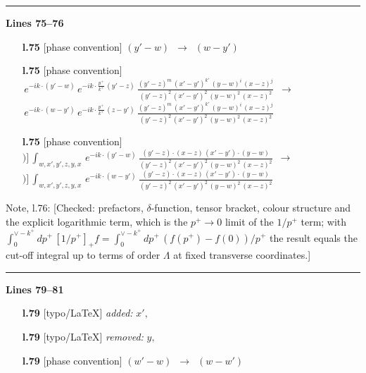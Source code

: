 \documentclass[10pt]{article}
\newenvironment{notebox}{\def\FrameCommand{{\color{notebar}\vrule width 1.5pt}\hspace{6pt}}\MakeFramed{\advance\hsize-\width\FrameRestore}\small}{\endMakeFramed}
\begin{document}
\noindent\rule{\linewidth}{0.3pt}\par\noindent\textbf{Lines 75--76} \par
\begin{itemize}[leftmargin=2.2em,itemsep=1pt,topsep=2pt]
\item[\textbf{l.75}] \textsf{\small [phase convention]} $\displaystyle (y'-w)$\ $\longrightarrow$\ $\displaystyle (w-y')$
\item[\textbf{l.75}] \textsf{\small [phase convention]} $\displaystyle \, e^{-ik\cdot (y'-w)}\, e^{-ik\cdot \frac{p^{+}}{k^{+}}\,(y'-z)}\,\frac{(y'-z)^{m}\,(x'-y')^{k'}\,(y-w)^{i}\,(x-z)^{j}}{(y'-z)^{2}\,(x'-y')^{2}\,(y-w)^{2}\,(x-z)^{2}}$\ $\longrightarrow$\ $\displaystyle \, e^{-ik\cdot (w-y')}\, e^{-ik\cdot \frac{p^{+}}{k^{+}}\,(z-y')}\,\frac{(y'-z)^{m}\,(x'-y')^{k'}\,(y-w)^{i}\,(x-z)^{j}}{(y'-z)^{2}\,(x'-y')^{2}\,(y-w)^{2}\,(x-z)^{2}}$
\item[\textbf{l.75}] \textsf{\small [phase convention]} $\displaystyle )\Big]\, \int_{w,x',y',z,y,x}\, e^{-ik\cdot (y'-w)}\,\frac{(y'-z)\cdot (x-z)\,(x'-y')\cdot (y-w)}{(y'-z)^{2}\,(x'-y')^{2}\,(y-w)^{2}\,(x-z)^{2}}$\ $\longrightarrow$\ $\displaystyle )\Big]\, \int_{w,x',y',z,y,x}\, e^{-ik\cdot (w-y')}\,\frac{(y'-z)\cdot (x-z)\,(x'-y')\cdot (y-w)}{(y'-z)^{2}\,(x'-y')^{2}\,(y-w)^{2}\,(x-z)^{2}}$
\end{itemize}
\begin{notebox}\textsf{\small Note, l.76:} [Checked: prefactors, $\delta$-function, tensor bracket, colour structure and the explicit logarithmic term, which is the $p^{+}\to 0$ limit of the $1/p^{+}$ term; with $\int_{0}^{\vee-k^{+}}dp^{+}\,[1/p^{+}]_{+}f=\int_{0}^{\vee-k^{+}}dp^{+}\,(f(p^{+})-f(0))/p^{+}$ the result equals the cut-off integral up to terms of order $\Lambda$ at fixed transverse coordinates.]\end{notebox}
\noindent\rule{\linewidth}{0.3pt}\par\noindent\textbf{Lines 79--81} \par
\begin{itemize}[leftmargin=2.2em,itemsep=1pt,topsep=2pt]
\item[\textbf{l.79}] \textsf{\small [typo/LaTeX]} \emph{added:} $\displaystyle x',$
\item[\textbf{l.79}] \textsf{\small [typo/LaTeX]} \emph{removed:} $\displaystyle y,$
\item[\textbf{l.79}] \textsf{\small [phase convention]} $\displaystyle (w'-w)$\ $\longrightarrow$\ $\displaystyle (w-w')$
\end{itemize}
\end{document}
